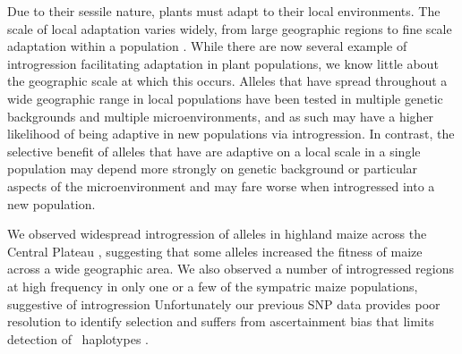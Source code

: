Due to their sessile nature, plants must adapt to their local environments. 
The scale of local adaptation varies widely, from large geographic regions \citep{lowry2010, fang2014} to fine scale adaptation within a population \citep{hamrick1979}.  
While there are now several example of introgression facilitating adaptation in plant populations, we know little about the geographic scale at which this occurs.
Alleles that have spread throughout a wide geographic range in local populations have been tested in multiple genetic backgrounds and multiple microenvironments, and as such may have a higher likelihood of being adaptive in new populations via introgression.
In contrast, the selective benefit of alleles that have are adaptive on a local scale in a single population may depend more strongly on genetic background or particular aspects of the microenvironment and may fare worse when introgressed into a new population. 

We observed widespread introgression of \zm{} alleles in highland maize across the Central Plateau \citep{Hufford2013}, suggesting that some \zm{} alleles increased the fitness of maize across a wide geographic area.  
We also observed a number of introgressed regions at high frequency in only one or a few of the sympatric maize populations, suggestive of introgression
Unfortunately our previous SNP data provides poor resolution to identify selection \citep{tiffin2014advances} and suffers from ascertainment bias that limits detection of \zm\ haplotypes \citep{Hufford2013}.  

